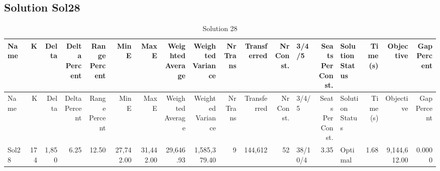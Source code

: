\documentclass[a4paper]{article}
\begin{document}
\clearpage
\subsection{Solution Sol28}

{\scriptsize
\begin{longtable}{lrrrrrrrrrrrlrlrrr}
\caption{Solution 28}
\\ \toprule
Name &K &Delta &\shortstack{Delta\\Percent} &\shortstack{Range\\Percent} &Min E &Max E &\shortstack{Weighted\\Average} &\shortstack{Weighted\\Variance} &\shortstack{Nr\\Trans} &Transferred &\shortstack{Nr\\Const.} &3/4/5 &\shortstack{Seats\\Per\\Const.} &\shortstack{Solution\\Status} &\shortstack{Time\\(s)} &Objective &\shortstack{Gap\\Percent} \\ \midrule
\endfirsthead
\toprule
Name &K &Delta &\shortstack{Delta\\Percent} &\shortstack{Range\\Percent} &Min E &Max E &\shortstack{Weighted\\Average} &\shortstack{Weighted\\Variance} &\shortstack{Nr\\Trans} &Transferred &\shortstack{Nr\\Const.} &3/4/5 &\shortstack{Seats\\Per\\Const.} &\shortstack{Solution\\Status} &\shortstack{Time\\(s)} &Objective &\shortstack{Gap\\Percent} \\ \midrule
\endhead
\bottomrule
\endfoot
Sol28&174&1,850& 6.25&12.50&27,742.00&31,442.00&29,646.93&1,585,379.40&9&144,612&52&38/10/4& 3.35&Optimal& 1.68&9,144,612.00&0.0000\\ 
\end{longtable}

}
\end{document}
